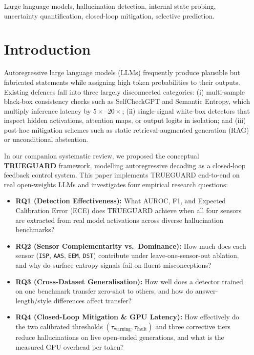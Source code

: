 \documentclass[journal]{IEEEtran}
\begin{document}
\begin{IEEEkeywords}
Large language models, hallucination detection, internal state probing, uncertainty quantification, closed-loop mitigation, selective prediction.
\end{IEEEkeywords}

\section{Introduction}
Autoregressive large language models (LLMs) frequently produce plausible but fabricated statements while assigning high token probabilities to their outputs. Existing defences fall into three largely disconnected categories: (i) multi-sample black-box consistency checks such as SelfCheckGPT and Semantic Entropy, which multiply inference latency by $5\times\text{--}20\times$; (ii) single-signal white-box detectors that inspect hidden activations, attention maps, or output logits in isolation; and (iii) post-hoc mitigation schemes such as static retrieval-augmented generation (RAG) or unconditional abstention.

In our companion systematic review, we proposed the conceptual \textbf{TRUEGUARD} framework, modelling autoregressive decoding as a closed-loop feedback control system. This paper implements TRUEGUARD end-to-end on real open-weights LLMs and investigates four empirical research questions:
\begin{itemize}
    \item \textbf{RQ1 (Detection Effectiveness):} What AUROC, F1, and Expected Calibration Error (ECE) does TRUEGUARD achieve when all four sensors are extracted from real model activations across diverse hallucination benchmarks?
    \item \textbf{RQ2 (Sensor Complementarity vs.\ Dominance):} How much does each sensor (\texttt{ISP}, \texttt{AAS}, \texttt{EEM}, \texttt{DST}) contribute under leave-one-sensor-out ablation, and why do surface entropy signals fail on fluent misconceptions?
    \item \textbf{RQ3 (Cross-Dataset Generalisation):} How well does a detector trained on one benchmark transfer zero-shot to others, and how do answer-length/style differences affect transfer?
    \item \textbf{RQ4 (Closed-Loop Mitigation \& GPU Latency):} How effectively do the two calibrated thresholds $(\tau_{\text{warning}}, \tau_{\text{fault}})$ and three corrective tiers reduce hallucinations on live open-ended generations, and what is the measured GPU overhead per token?
\end{itemize}
\end{document}
